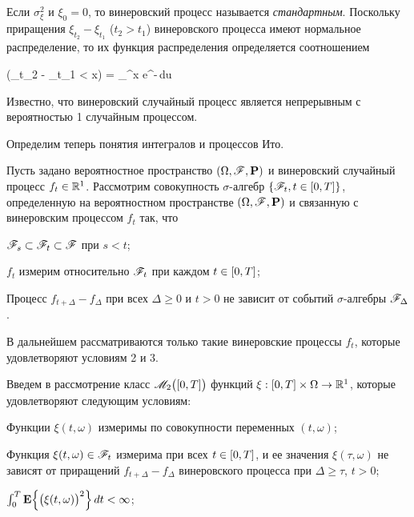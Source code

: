 Если $\sigma_\xi^2$ и $\xi_0 = 0$, то винеровский процесс называется \emph{стандартным}. Поскольку приращения $\xi_{t_2} - \xi_{t_1}$ ($t_2 > t_1$) винеровского процесса имеют нормальное распределение, то их функция распределения определяется соотношением

\beqn
    \prob(\xi_{t_2} - \xi_{t_1} < x) =  \int\limits_\infty^x e^{-}\,du 
\eeqn

Известно, что винеровский случайный процесс является непрерывным с вероятностью 1 случайным процессом.

\br

Определим теперь понятия интегралов и процессов Ито.

Пусть задано вероятностное пространство $(\Omega, \mathscr{F}, \mathbf{P})$ и винеровский случайный процесс $f_t \in \mathbb{R}^{1}$. Рассмотрим совокупность $\sigma$-алгебр $\{ \mathscr{F}_t, t \in [0, T] \}$, определенную на вероятностном пространстве $(\Omega, \mathscr{F}, \mathbf{P})$ и связанную с винеровским процессом $f_t$ так, что

\benum
    \item
        $\mathscr{F}_s \subset \mathscr{F}_t \subset \mathscr{F}$ при $s<t$;

    \item
        $f_t$ измерим относительно $\mathscr{F}_t$ при каждом $t \in [0, T]$;

    \item
        Процесс $f_{t+\Delta} - f_\Delta$ при всех $\Delta \geqslant 0$ и $t > 0$ не зависит от событий $\sigma$-алгебры $\mathscr{F}_\Delta$.
\eenum

В дальнейшем рассматриваются только такие винеровские процессы $f_t$, которые удовлетворяют условиям 2 и 3.

Введем в рассмотрение класс $\mathscr{M}_2\bigl( [0, T] \bigr)$ функций $\xi: [0, T] \times \Omega \to \mathbb{R}^{1}$, которые удовлетворяют следующим условиям:

\benum
    \item
        Функции $\xi(t, \omega)$ измеримы по совокупности переменных $(t, \omega)$;

    \item
        Функция $\xi(t, \omega) \in \mathscr{F}_t$ измерима при всех $t \in [0, T]$, и ее значения $\xi(\tau, \omega)$ не зависят от приращений $f_{t+\Delta} - f_\Delta$ винеровского процесса при $\Delta \geqslant \tau$, $t > 0$;

    \item
        $\int_0^T \mathbf{E} \Bigl\{ \bigl( \xi(t, \omega) \bigr)^2 \Bigr\}\,dt < \infty$;


